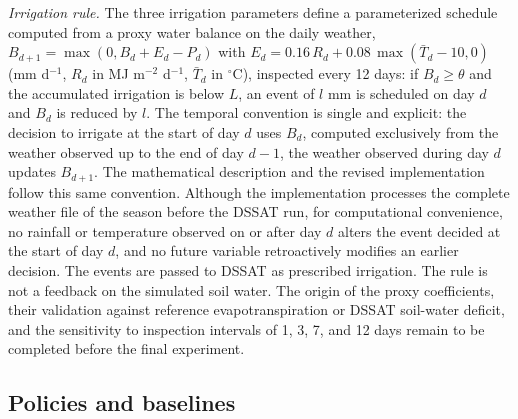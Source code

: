 \documentclass[times,final,authoryear]{elsarticle}
\begin{document}
\emph{Irrigation rule.} The three irrigation parameters define a parameterized schedule computed from a proxy water balance on the daily weather, $B_{d+1} = \max(0, B_d + E_d - P_d)$ with $E_d = 0.16\,R_d + 0.08\,\max(\bar{T}_d - 10, 0)$ (mm d$^{-1}$, $R_d$ in MJ m$^{-2}$ d$^{-1}$, $\bar{T}_d$ in $^{\circ}$C), inspected every 12 days: if $B_d \geq \theta$ and the accumulated irrigation is below $L$, an event of $l$ mm is scheduled on day $d$ and $B_d$ is reduced by $l$. The temporal convention is single and explicit: the decision to irrigate at the start of day $d$ uses $B_d$, computed exclusively from the weather observed up to the end of day $d-1$, the weather observed during day $d$ updates $B_{d+1}$. The mathematical description and the revised implementation follow this same convention. Although the implementation processes the complete weather file of the season before the DSSAT run, for computational convenience, no rainfall or temperature observed on or after day $d$ alters the event decided at the start of day $d$, and no future variable retroactively modifies an earlier decision. The events are passed to DSSAT as prescribed irrigation. The rule is not a feedback on the simulated soil water. The origin of the proxy coefficients, their validation against reference evapotranspiration or DSSAT soil-water deficit, and the sensitivity to inspection intervals of 1, 3, 7, and 12 days remain to be completed before the final experiment.


\subsection{Policies and baselines}
\label{subbaselines}
\end{document}
